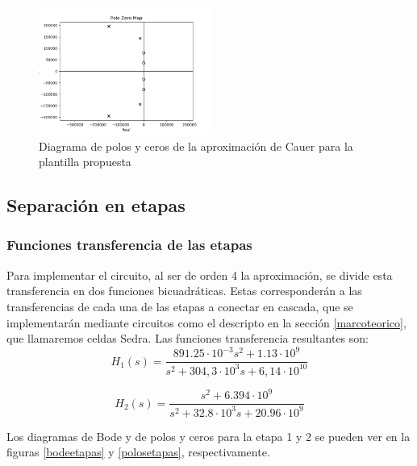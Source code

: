 \begin{figure}[H]
\begin{centering}
\includegraphics[width=0.5\textwidth]{../Ex3/Resources/poloscauer.png}
\par\end{centering}
\caption{Diagrama de polos y ceros de la aproximación de Cauer para la plantilla propuesta}
\label{poloscauer}
\end{figure}

\subsection{Separación en etapas}
\subsubsection{Funciones transferencia de las etapas}
Para implementar el circuito, al ser de orden 4 la aproximación, se divide esta transferencia en dos funciones bicuadráticas. Estas corresponderán a las transferencias de cada una de las etapas a conectar en cascada, que se implementarán mediante circuitos como el descripto en la sección \ref{marcoteorico}, que llamaremos celdas Sedra.
Las funciones transferencia resultantes son:
\[
H_{1}(s)=\frac{891.25\cdot10^{-3}s^{2}+1.13\cdot10^{9}}{s^{2}+304,3\cdot10^{3}s+6,14\cdot10^{10}}
\]

\[
H_{2}(s)=\frac{s^{2}+6.394\cdot10^{9}}{s^{2}+32.8\cdot10^{3}s+20.96\cdot10^{9}}
\]

Los diagramas de Bode y de polos y ceros para la etapa 1 y 2 se pueden ver en la figuras \ref{bodeetapas} y \ref{polosetapas}, respectivamente.


